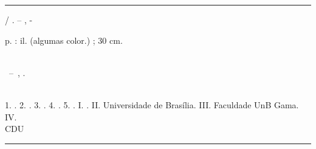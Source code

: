 \begin{fichacatalografica}
	\vspace*{\fill}					%
	\hrule							%
	\begin{center}					%
	\begin{minipage}[c]{12.5cm}		%
	
	\imprimirautor
	
	\hspace{0.5cm} \imprimirtitulo  / \imprimirautor. --
	\imprimirlocal, \imprimirdata-
	
	\hspace{0.5cm} \pageref{LastPage} p. : il. (algumas color.) ; 30 cm.\\
	
	\hspace{0.5cm} \imprimirorientadorRotulo~\imprimirorientador\\
	
	\hspace{0.5cm}
	\parbox[t]{\textwidth}{\imprimirtipotrabalho~--~\imprimirinstituicao,
	\imprimirdata.}\\
	
	\hspace{0.5cm}
		1. \imprimirpalavrachaveum.
		2. \imprimirpalavrachavedois.
        3. \imprimirpalavrachavetres.
        4. \imprimirpalavrachavequatro.
        5. \imprimirpalavrachavecinco.
		I. \imprimirorientador.
		II. Universidade de Brasília.
		III. Faculdade UnB Gama.
		IV. \imprimirtitulo\\ 			
	
	\hspace{8.75cm} CDU \\ %
	
	\end{minipage}
	\end{center}
	\hrule
        \pagebreak
\end{fichacatalografica}
